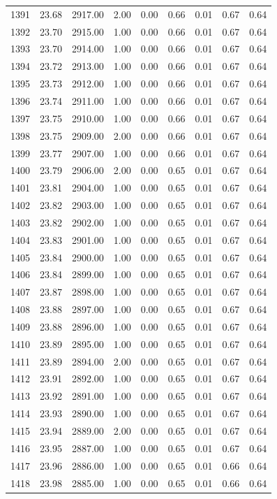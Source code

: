 \documentclass{article}\usepackage[]{graphicx}\usepackage[]{color}
\begin{document}
\begin{longtable}{rrrrrrrrr}
  1391 & 23.68 & 2917.00 & 2.00 & 0.00 & 0.66 & 0.01 & 0.67 & 0.64 \\ 
  1392 & 23.70 & 2915.00 & 1.00 & 0.00 & 0.66 & 0.01 & 0.67 & 0.64 \\ 
  1393 & 23.70 & 2914.00 & 1.00 & 0.00 & 0.66 & 0.01 & 0.67 & 0.64 \\ 
  1394 & 23.72 & 2913.00 & 1.00 & 0.00 & 0.66 & 0.01 & 0.67 & 0.64 \\ 
  1395 & 23.73 & 2912.00 & 1.00 & 0.00 & 0.66 & 0.01 & 0.67 & 0.64 \\ 
  1396 & 23.74 & 2911.00 & 1.00 & 0.00 & 0.66 & 0.01 & 0.67 & 0.64 \\ 
  1397 & 23.75 & 2910.00 & 1.00 & 0.00 & 0.66 & 0.01 & 0.67 & 0.64 \\ 
  1398 & 23.75 & 2909.00 & 2.00 & 0.00 & 0.66 & 0.01 & 0.67 & 0.64 \\ 
  1399 & 23.77 & 2907.00 & 1.00 & 0.00 & 0.66 & 0.01 & 0.67 & 0.64 \\ 
  1400 & 23.79 & 2906.00 & 2.00 & 0.00 & 0.65 & 0.01 & 0.67 & 0.64 \\ 
  1401 & 23.81 & 2904.00 & 1.00 & 0.00 & 0.65 & 0.01 & 0.67 & 0.64 \\ 
  1402 & 23.82 & 2903.00 & 1.00 & 0.00 & 0.65 & 0.01 & 0.67 & 0.64 \\ 
  1403 & 23.82 & 2902.00 & 1.00 & 0.00 & 0.65 & 0.01 & 0.67 & 0.64 \\ 
  1404 & 23.83 & 2901.00 & 1.00 & 0.00 & 0.65 & 0.01 & 0.67 & 0.64 \\ 
  1405 & 23.84 & 2900.00 & 1.00 & 0.00 & 0.65 & 0.01 & 0.67 & 0.64 \\ 
  1406 & 23.84 & 2899.00 & 1.00 & 0.00 & 0.65 & 0.01 & 0.67 & 0.64 \\ 
  1407 & 23.87 & 2898.00 & 1.00 & 0.00 & 0.65 & 0.01 & 0.67 & 0.64 \\ 
  1408 & 23.88 & 2897.00 & 1.00 & 0.00 & 0.65 & 0.01 & 0.67 & 0.64 \\ 
  1409 & 23.88 & 2896.00 & 1.00 & 0.00 & 0.65 & 0.01 & 0.67 & 0.64 \\ 
  1410 & 23.89 & 2895.00 & 1.00 & 0.00 & 0.65 & 0.01 & 0.67 & 0.64 \\ 
  1411 & 23.89 & 2894.00 & 2.00 & 0.00 & 0.65 & 0.01 & 0.67 & 0.64 \\ 
  1412 & 23.91 & 2892.00 & 1.00 & 0.00 & 0.65 & 0.01 & 0.67 & 0.64 \\ 
  1413 & 23.92 & 2891.00 & 1.00 & 0.00 & 0.65 & 0.01 & 0.67 & 0.64 \\ 
  1414 & 23.93 & 2890.00 & 1.00 & 0.00 & 0.65 & 0.01 & 0.67 & 0.64 \\ 
  1415 & 23.94 & 2889.00 & 2.00 & 0.00 & 0.65 & 0.01 & 0.67 & 0.64 \\ 
  1416 & 23.95 & 2887.00 & 1.00 & 0.00 & 0.65 & 0.01 & 0.67 & 0.64 \\ 
  1417 & 23.96 & 2886.00 & 1.00 & 0.00 & 0.65 & 0.01 & 0.66 & 0.64 \\ 
  1418 & 23.98 & 2885.00 & 1.00 & 0.00 & 0.65 & 0.01 & 0.66 & 0.64 \\ 
   \hline
\hline
\end{longtable}
\end{document}
